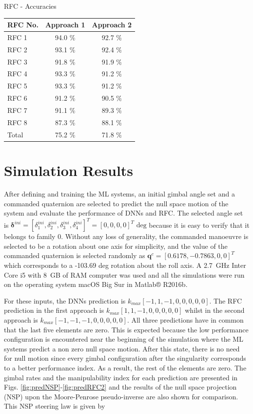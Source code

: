 \documentclass[aerospace,article,submit,moreauthors,dvi2pdf]{Definitions/mdpi}
\begin{document}
\begin{specialtable}[hbt!]
\caption{\label{tab:RFCaccuracies} RFC - Accuracies}
\begin{tabular}{lcc}
\toprule
\textbf{RFC No.}  & \textbf{Approach 1} & \textbf{Approach 2}  \\
\midrule
RFC 1 &  94.0 \%  & 92.7 \%   \\
RFC 2 &  93.1 \%  & 92.4 \%   \\
RFC 3 &  91.8 \%  &91.9 \%    \\
RFC 4 &  93.3 \%  & 91.2 \%   \\
RFC 5 &  93.3 \%  &91.2 \%    \\
RFC 6 &  91.2 \%  &90.5 \%    \\
RFC 7 &  91.1 \%  &89.3 \%    \\
RFC 8 &  87.3 \%  &88.1 \%    \\ 
Total   &  75.2 \%  &71.8 \%    \\
\bottomrule
\end{tabular}
\end{specialtable}

\section{Simulation Results}
After defining and training the ML systems, an initial gimbal angle set and a commanded quaternion are selected to predict the null space motion of the system and evaluate the performance of DNNs and RFC. The selected angle set is $\boldsymbol{\delta}^{ini}=[\delta_1^{ini}, \delta_2^{ini}, \delta_3^{ini}, \delta_4^{ini}]^T=[0, 0, 0, 0]^T$ $\text{deg}$ because it is easy to verify that it belongs to family 0.  Without any loss of generality, the commanded manoeuvre is selected to be a rotation about one axis for simplicity, and the value of the commanded quaternion is selected randomly as $\textbf{q}^c=[0.6178,   -0.7863  ,0 ,0]^T$ which corresponds to a -103.69 deg rotation about the roll axis. A 2.7~GHz Inter Core i5 with 8~GB of RAM computer was used and all the simulations were run on the operating system macOS Big Sur in Matlab® R2016b.

For these inputs, the DNNs prediction is $k_{max}[-1,     1,    -1,    0,     0,     0,     0,     0]$. The RFC prediction in the first approach is $k_{max}[1,     1,    -1,    0,     0,     0,     0,     0]$ whilst in the second approach is $k_{max} [-1,     -1,    -1,    0,     0,     0,    0,     0]$. 
All three predictions have in common that the last five elements are zero. This is expected because the low performance configuration is encountered near the beginning of the simulation where the ML systems predict a non zero null space motion. After this state, there is no need for null motion since every gimbal configuration after the singularity corresponds to a better performance index. As a result, the rest of the elements are zero.
The gimbal rates and the manipulability index for each prediction are presented in Figs. \ref{fig:predNSP}-\ref{fig:predRFC2} and the results of the null space projection (NSP) upon the Moore-Penrose pseudo-inverse are also shown for comparison. This NSP steering law is given by
\end{document}
